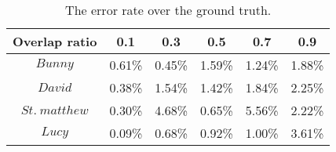 \begin{table}[t]
\centering
\small
\caption{
The error rate over the ground truth.
}
\label{table:error}
\begin{tabular}{|c|c|c|c|c|c|}
\hline
Overlap   ratio & 0.1    & 0.3    & 0.5    & 0.7    & 0.9    \\ \hline
$Bunny$         & 0.61\% & 0.45\% & 1.59\% & 1.24\% & 1.88\% \\ \hline
$David$         & 0.38\% & 1.54\% & 1.42\% & 1.84\% & 2.25\% \\ \hline
$St.~matthew$     & 0.30\% & 4.68\% & 0.65\% & 5.56\% & 2.22\% \\ \hline
$Lucy$          & 0.09\% & 0.68\% & 0.92\% & 1.00\% & 3.61\% \\ \hline
\end{tabular}
\end{table}